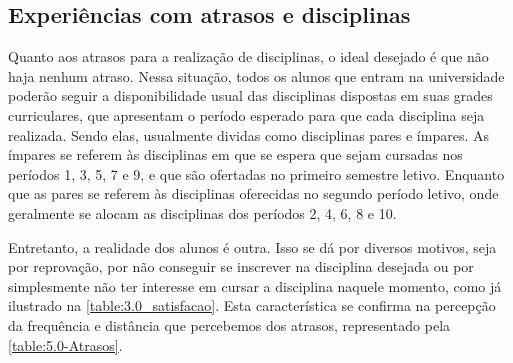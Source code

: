 \begin{apendicesenv}
  \subsection{Experiências com atrasos e disciplinas} %

  Quanto aos atrasos para a realização de disciplinas, o ideal desejado é que não haja nenhum atraso. Nessa situação, todos os alunos que entram na universidade poderão seguir a disponibilidade usual das disciplinas dispostas em suas grades curriculares, que apresentam o período esperado para que cada disciplina seja realizada. Sendo elas, usualmente dividas como disciplinas pares e ímpares. As ímpares se referem às disciplinas em que se espera que sejam cursadas nos períodos 1, 3, 5, 7 e 9, e que são ofertadas no primeiro semestre letivo. Enquanto que as pares se referem às disciplinas oferecidas no segundo período letivo, onde geralmente se alocam as disciplinas dos períodos 2, 4, 6, 8 e 10.

  Entretanto, a realidade dos alunos é outra. Isso se dá por diversos motivos, seja por reprovação, por não conseguir se inscrever na disciplina desejada ou por simplesmente não ter interesse em cursar a disciplina naquele momento, como já ilustrado na \autoref{table:3.0_satisfacao}. Esta característica se confirma na percepção da frequência e distância que percebemos dos atrasos, representado pela \autoref{table:5.0-Atrasos}.

\end{apendicesenv}
